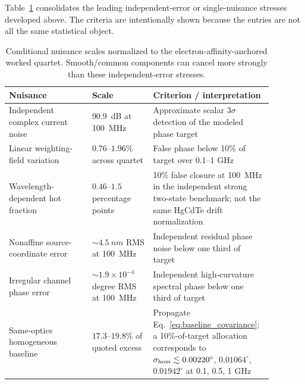 \documentclass[11pt]{article}
\begin{document}
Table~\ref{tab:nuisance_budget} consolidates the leading independent-error or single-nuisance stresses developed above. The criteria are intentionally shown because the entries are not all the same statistical object.
\begin{table}[H]
\centering
\caption{Conditional nuisance scales normalized to the electron-affinity-anchored worked quartet. Smooth/common components can cancel more strongly than these independent-error stresses.}
\label{tab:nuisance_budget}
\begin{tabular}{p{0.30\linewidth}p{0.22\linewidth}p{0.36\linewidth}}
\toprule
Nuisance & Scale & Criterion / interpretation \\
\midrule
Independent complex current noise & \SI{90.9}{dB} at \SI{100}{MHz} & Approximate scalar $3\sigma$ detection of the modeled phase target \\
Linear weighting-field variation & $0.76$--$1.96\%$ across quartet & False phase below 10\% of target over 0.1--1 GHz \\
Wavelength-dependent hot fraction & $0.46$--$1.5$ percentage points & 10\% false closure at \SI{100}{MHz} in the independent strong two-state benchmark; not the same HgCdTe drift normalization \\
Nonaffine source-coordinate error & $\sim4.5~\si{nm}$ RMS at \SI{100}{MHz} & Independent residual phase noise below one third of target \\
Irregular channel phase error & $\sim1.9\times10^{-4}$ degree RMS at \SI{100}{MHz} & Independent high-curvature spectral phase below one third of target \\
Same-optics homogeneous baseline & $17.3$--$19.8\%$ of quoted excess & Propagate Eq.~\eqref{eq:baseline_covariance}; a 10\%-of-target allocation corresponds to $\sigma_{\rm hom}\lesssim0.00220^\circ$, $0.01064^\circ$, $0.01942^\circ$ at 0.1, 0.5, 1 GHz \\
\bottomrule
\end{tabular}
\end{table}
\end{document}
